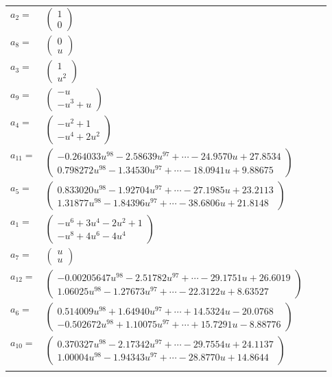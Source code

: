 \documentclass[1p]{elsarticle_modified}
\theoremstyle{definition}
\begin{document}
\begin{tabular}{m{7pt} m{180pt} m{7pt} m{180pt} }
\flushright $a_{2}=$&$\begin{pmatrix}1\\0\end{pmatrix}$ \\
\flushright $a_{8}=$&$\begin{pmatrix}0\\u\end{pmatrix}$ \\
\flushright $a_{3}=$&$\begin{pmatrix}1\\u^2\end{pmatrix}$ \\
\flushright $a_{9}=$&$\begin{pmatrix}- u\\- u^3+u\end{pmatrix}$ \\
\flushright $a_{4}=$&$\begin{pmatrix}- u^2+1\\- u^4+2 u^2\end{pmatrix}$ \\
\flushright $a_{11}=$&$\begin{pmatrix}-0.264033 u^{98}-2.58639 u^{97}+\cdots-24.9570 u+27.8534\\0.798272 u^{98}-1.34530 u^{97}+\cdots-18.0941 u+9.88675\end{pmatrix}$ \\
\flushright $a_{5}=$&$\begin{pmatrix}0.833020 u^{98}-1.92704 u^{97}+\cdots-27.1985 u+23.2113\\1.31877 u^{98}-1.84396 u^{97}+\cdots-38.6806 u+21.8148\end{pmatrix}$ \\
\flushright $a_{1}=$&$\begin{pmatrix}- u^6+3 u^4-2 u^2+1\\- u^8+4 u^6-4 u^4\end{pmatrix}$ \\
\flushright $a_{7}=$&$\begin{pmatrix}u\\u\end{pmatrix}$ \\
\flushright $a_{12}=$&$\begin{pmatrix}-0.00205647 u^{98}-2.51782 u^{97}+\cdots-29.1751 u+26.6019\\1.06025 u^{98}-1.27673 u^{97}+\cdots-22.3122 u+8.63527\end{pmatrix}$ \\
\flushright $a_{6}=$&$\begin{pmatrix}0.514009 u^{98}+1.64940 u^{97}+\cdots+14.5324 u-20.0768\\-0.502672 u^{98}+1.10075 u^{97}+\cdots+15.7291 u-8.88776\end{pmatrix}$ \\
\flushright $a_{10}=$&$\begin{pmatrix}0.370327 u^{98}-2.17342 u^{97}+\cdots-29.7554 u+24.1137\\1.00004 u^{98}-1.94343 u^{97}+\cdots-28.8770 u+14.8644\end{pmatrix}$\\&\end{tabular}
\end{document}
